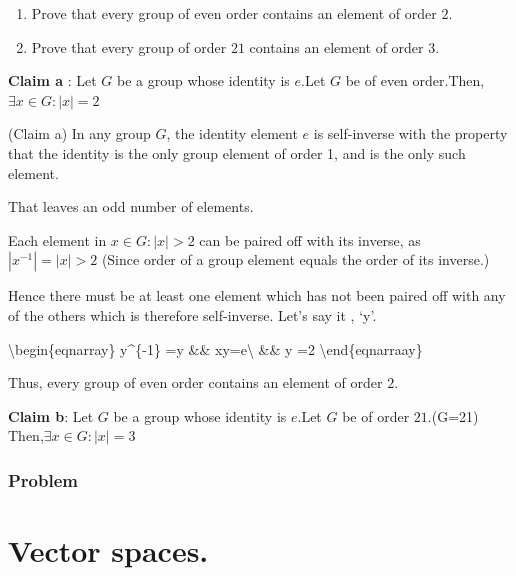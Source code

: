 \documentclass[
]{book}
\providecommand{\tightlist}{%
  \setlength{\itemsep}{0pt}\setlength{\parskip}{0pt}}
\begin{document}
\hypertarget{unnamed-chunk-110}{}
\begin{enumerate}
\def\labelenumi{(\alph{enumi})}
\tightlist
\item
  Prove that every group of even order contains an element of order
  \(2\).
\item
  Prove that every group of order \(21\) contains an element of order
  \(3\).
\end{enumerate}

\textbf{Claim a} : Let \(G\) be a group whose identity is \(e\).Let
\(G\) be of even order.Then,\(\exists x \in G: |x| = 2\)

(Claim a) In any group \(G\), the identity element \(e\) is self-inverse
with the property that the identity is the only group element of order
1, and is the only such element.

That leaves an odd number of elements.

Each element in \(x \in G: |x| > 2\) can be paired off with its inverse,
as \(|x^{-1}| = |x| > 2\) (Since order of a group element equals the
order of its inverse.)

Hence there must be at least one element which has not been paired off
with any of the others which is therefore self-inverse. Let's say it ,
`y'.

\textbackslash begin\{eqnarray\} y\^{}\{-1\} =y \&\iff\&
x\cdot y=e\textbackslash{} \&\iff \& \textbar y\textbar{} =2
\textbackslash end\{eqnarraay\}

Thus, every group of even order contains an element of order \(2\).

\textbf{Claim b}: Let \(G\) be a group whose identity is \(e\).Let \(G\)
be of order \(21\).(\textbar G=21\textbar)
Then,\(\exists x \in G: |x| = 3\)

\hypertarget{problem-3}{%
\subsection{Problem}\label{problem-3}}

\hypertarget{vector-spaces.}{%
\chapter{Vector spaces.}\label{vector-spaces.}}

\backmatter
\end{document}
